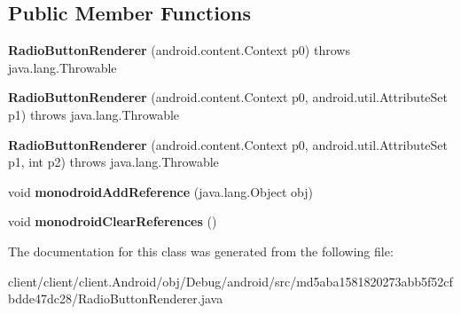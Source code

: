 \subsection*{Public Member Functions}
\begin{DoxyCompactItemize}
\item 
\hypertarget{classmd5aba1581820273abb5f52cfbdde47dc28_1_1RadioButtonRenderer_ab1a5040792b403a228d66287aa1b8e1c}{}{\bfseries Radio\+Button\+Renderer} (android.\+content.\+Context p0)  throws java.\+lang.\+Throwable 	\label{classmd5aba1581820273abb5f52cfbdde47dc28_1_1RadioButtonRenderer_ab1a5040792b403a228d66287aa1b8e1c}

\item 
\hypertarget{classmd5aba1581820273abb5f52cfbdde47dc28_1_1RadioButtonRenderer_a2e68d3af1b4f65f96f87c35ee04c0a7e}{}{\bfseries Radio\+Button\+Renderer} (android.\+content.\+Context p0, android.\+util.\+Attribute\+Set p1)  throws java.\+lang.\+Throwable 	\label{classmd5aba1581820273abb5f52cfbdde47dc28_1_1RadioButtonRenderer_a2e68d3af1b4f65f96f87c35ee04c0a7e}

\item 
\hypertarget{classmd5aba1581820273abb5f52cfbdde47dc28_1_1RadioButtonRenderer_a80d071d50363cf46ae2cc90daef4b41b}{}{\bfseries Radio\+Button\+Renderer} (android.\+content.\+Context p0, android.\+util.\+Attribute\+Set p1, int p2)  throws java.\+lang.\+Throwable 	\label{classmd5aba1581820273abb5f52cfbdde47dc28_1_1RadioButtonRenderer_a80d071d50363cf46ae2cc90daef4b41b}

\item 
\hypertarget{classmd5aba1581820273abb5f52cfbdde47dc28_1_1RadioButtonRenderer_a32412f7f372af05cd23c3ca327aa2f53}{}void {\bfseries monodroid\+Add\+Reference} (java.\+lang.\+Object obj)\label{classmd5aba1581820273abb5f52cfbdde47dc28_1_1RadioButtonRenderer_a32412f7f372af05cd23c3ca327aa2f53}

\item 
\hypertarget{classmd5aba1581820273abb5f52cfbdde47dc28_1_1RadioButtonRenderer_ae050a1d836c846c8aee8702268680342}{}void {\bfseries monodroid\+Clear\+References} ()\label{classmd5aba1581820273abb5f52cfbdde47dc28_1_1RadioButtonRenderer_ae050a1d836c846c8aee8702268680342}

\end{DoxyCompactItemize}


The documentation for this class was generated from the following file\+:\begin{DoxyCompactItemize}
\item 
client/client/client.\+Android/obj/\+Debug/android/src/md5aba1581820273abb5f52cfbdde47dc28/Radio\+Button\+Renderer.\+java\end{DoxyCompactItemize}
